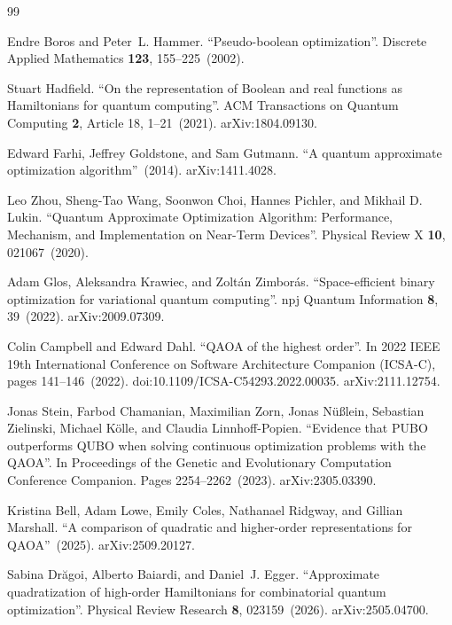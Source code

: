 \begin{thebibliography}{99}

Endre Boros and Peter~L. Hammer.
\newblock ``Pseudo-boolean optimization''.
\newblock Discrete Applied Mathematics {\bf 123}, 155--225~(2002).

Stuart Hadfield.
\newblock ``On the representation of Boolean and real functions as Hamiltonians for quantum computing''.
\newblock ACM Transactions on Quantum Computing {\bf 2}, Article 18, 1--21~(2021).
\newblock arXiv:1804.09130.

Edward Farhi, Jeffrey Goldstone, and Sam Gutmann.
\newblock ``A quantum approximate optimization algorithm''~(2014).
\newblock arXiv:1411.4028.

Leo Zhou, Sheng-Tao Wang, Soonwon Choi, Hannes Pichler, and Mikhail D. Lukin.
\newblock ``Quantum Approximate Optimization Algorithm: Performance, Mechanism, and Implementation on Near-Term Devices''.
\newblock Physical Review X {\bf 10}, 021067~(2020).


Adam Glos, Aleksandra Krawiec, and Zolt{\'a}n Zimbor{\'a}s.
\newblock ``Space-efficient binary optimization for variational quantum computing''.
\newblock npj Quantum Information {\bf 8}, 39~(2022).
\newblock arXiv:2009.07309.

Colin Campbell and Edward Dahl.
\newblock ``QAOA of the highest order''.
\newblock In 2022 IEEE 19th International Conference on Software Architecture Companion (ICSA-C), pages 141--146~(2022).
\newblock doi:10.1109/ICSA-C54293.2022.00035.
\newblock arXiv:2111.12754.

Jonas Stein, Farbod Chamanian, Maximilian Zorn, Jonas N{\"u}{\ss}lein, Sebastian Zielinski, Michael K{\"o}lle, and Claudia Linnhoff-Popien.
\newblock ``Evidence that PUBO outperforms QUBO when solving continuous optimization problems with the QAOA''.
\newblock In Proceedings of the Genetic and Evolutionary Computation Conference Companion.
\newblock Pages 2254--2262~(2023).
\newblock arXiv:2305.03390.

Kristina Bell, Adam Lowe, Emily Coles, Nathanael Ridgway, and Gillian Marshall.
\newblock ``A comparison of quadratic and higher-order representations for QAOA''~(2025).
\newblock arXiv:2509.20127.

Sabina Dr{\u a}goi, Alberto Baiardi, and Daniel~J. Egger.
\newblock ``Approximate quadratization of high-order Hamiltonians for combinatorial quantum optimization''.
\newblock Physical Review Research {\bf 8}, 023159~(2026).
\newblock arXiv:2505.04700.


\end{thebibliography}
